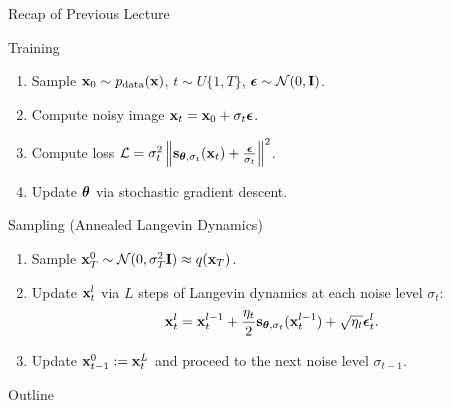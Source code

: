 \documentclass{beamer}
\begin{document}
\begin{frame}{Recap of Previous Lecture}
    \begin{block}{Training}
        \begin{enumerate}
            \item Sample $\mathbf{x}_0 \sim p_{\text{data}}(\mathbf{x})$, $t \sim U\{1, T\}$, $\boldsymbol{\epsilon} \sim \mathcal{N}(0, \mathbf{I})$.
            \item Compute noisy image $\mathbf{x}_t = \mathbf{x}_0 + \sigma_t \boldsymbol{\epsilon}$.
            \item Compute loss $ \mathcal{L} = \sigma_t^2 \left\| \mathbf{s}_{\boldsymbol{\theta}, \sigma_t}(\mathbf{x}_t) + \frac{\boldsymbol{\epsilon}}{\sigma_t} \right\|^2 $.
            \item Update $\boldsymbol{\theta}$ via stochastic gradient descent.
        \end{enumerate}
        \vspace{-0.3cm}
    \end{block}
    \vspace{-0.2cm}
    \begin{block}{Sampling (Annealed Langevin Dynamics)}
        \begin{enumerate}
            \item Sample $\mathbf{x}_T^0 \sim \mathcal{N}(0, \sigma_T^2 \mathbf{I}) \approx q(\mathbf{x}_T)$.
            \item Update $\mathbf{x}_t^l$ via $L$ steps of Langevin dynamics at each noise level $\sigma_t$:
            \vspace{-0.3cm}
            \[
                \mathbf{x}_t^l = \mathbf{x}_t^{l-1} + \frac{\eta_t}{2} \mathbf{s}_{\boldsymbol{\theta}, \sigma_t}(\mathbf{x}_t^{l-1}) + \sqrt{\eta_t} \boldsymbol{\epsilon}_t^l.
            \]
            \vspace{-0.5cm}
            \item Update $\mathbf{x}_{t-1}^0 := \mathbf{x}_t^L$ and proceed to the next noise level $\sigma_{t-1}$.
        \end{enumerate}
    \end{block}
\end{frame}
\begin{frame}{Outline}
	\tableofcontents
\end{frame}
\end{document}
